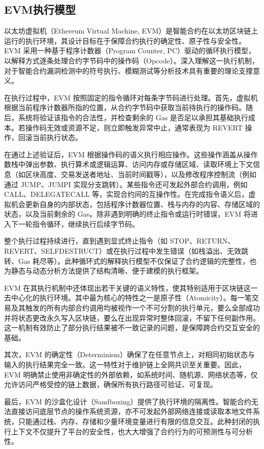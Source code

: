 \documentclass[print, master, vlined, timesmath]{DissertUESTC}
\begin{document}
\subsection{EVM执行模型}

以太坊虚拟机（Ethereum Virtual Machine, EVM）是智能合约在以太坊区块链上运行的执行环境，其设计目标在于保障合约执行的确定性、原子性与安全性\cite{}。EVM 采用一种基于程序计数器（Program Counter, PC）驱动的循环执行模型，以解释方式逐条处理合约字节码中的操作码（Opcode）。深入理解这一执行机制，对于智能合约漏洞检测中的符号执行、模糊测试等分析技术具有重要的理论支撑意义。

在执行过程中，EVM 按照固定的指令循环对每条字节码进行处理。首先，虚拟机根据当前程序计数器所指的位置，从合约字节码中获取当前待执行的操作码。随后，系统将验证该指令的合法性，并检查剩余的 Gas 是否足以承担其基础执行成本。若操作码无效或资源不足，则立即触发异常中止，通常表现为 REVERT 操作，回滚当前执行状态。

在通过上述验证后，EVM 根据操作码的语义执行相应操作。这些操作涵盖从操作数栈中弹出参数、执行算术或逻辑运算、访问内存或存储区域、读取环境上下文信息（如区块高度、交易发送者地址、当前时间戳等），以及修改程序控制流（例如通过 JUMP、JUMPI 实现分支跳转）。某些指令还可发起外部合约调用，例如 CALL、DELEGATECALL 等，实现合约间的互操作性。在完成指令语义后，虚拟机会更新自身的内部状态，包括程序计数器位置、栈与内存的内容、存储区域的状态，以及当前剩余的 Gas。除非遇到明确的终止指令或运行时错误，EVM 将进入下一轮指令循环，继续执行后续字节码。

整个执行过程持续进行，直到遇到显式终止指令（如 STOP、RETURN、REVERT、SELFDESTRUCT）或在执行过程中发生错误（如栈溢出、无效跳转、Gas 耗尽等）。此种循环式的解释执行模型不仅保证了合约逻辑的完整性，也为静态与动态分析方法提供了结构清晰、便于建模的执行框架。

EVM 在其执行机制中还体现出若干关键的语义特性，使其特别适用于区块链这一去中心化的执行环境。其中最为核心的特性之一是原子性（Atomicity）\cite{}。每一笔交易及其触发的所有内部合约调用均被视作一个不可分割的执行单元，要么全部成功并将状态更改永久写入区块链，要么在出现异常时整体回滚，不留下任何副作用。这一机制有效防止了部分执行结果被不一致记录的问题，是保障跨合约交互安全的基础。

其次，EVM 的确定性（Determinism）\cite{}确保了在任意节点上，对相同初始状态与输入的执行结果完全一致。这一特性对于维护链上全网共识至关重要。因此，EVM 明确禁止使用非确定性的外部依赖，如系统时间、随机源、网络状态等，仅允许访问严格受控的链上数据，确保所有执行路径可验证、可复现。

最后，EVM 的沙盒化设计（Sandboxing）\cite{}提供了执行环境的隔离性。智能合约无法直接访问底层节点的操作系统资源，亦不可发起外部网络连接或读取本地文件系统，只能通过栈、内存、存储和少量环境变量进行有限的信息交互。此种封闭的执行上下文不仅提升了平台的安全性，也大大增强了合约行为的可预测性与可分析性。
\end{document}
